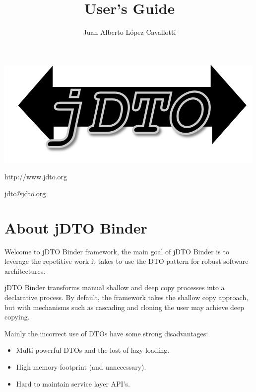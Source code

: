 \documentclass[11pt]{article}
\title{\JDTO \JDV User's Guide}
\author{Juan Alberto López Cavallotti}
\newcommand{\JDTO}{jDTO Binder\xspace}
\begin{document}
\maketitle

\begin{center}

\includegraphics[scale=1]{logo.png}

\begin{huge}
 http://www.jdto.org
\end{huge}

\begin{LARGE}
 jdto@jdto.org
\end{LARGE}
\end{center}


\newpage
\tableofcontents

\newpage


\section{About \JDTO}


Welcome to \JDTO framework, the main goal of \JDTO is to leverage the repetitive work it takes to use
the DTO pattern for robust software architectures. 

\JDTO transforms manual shallow and deep copy processes into a declarative process. By default, the framework
takes the shallow copy approach, but with mechanisms such as cascading and cloning the user may achieve deep
copying.

Mainly the incorrect use of DTOs have some strong
disadvantages: 

\begin{itemize}
\item Multi powerful DTOs and the lost of lazy loading.
\item High memory footprint (and unnecessary).
\item Hard to maintain service layer API's.
\end{itemize}
\end{document}
